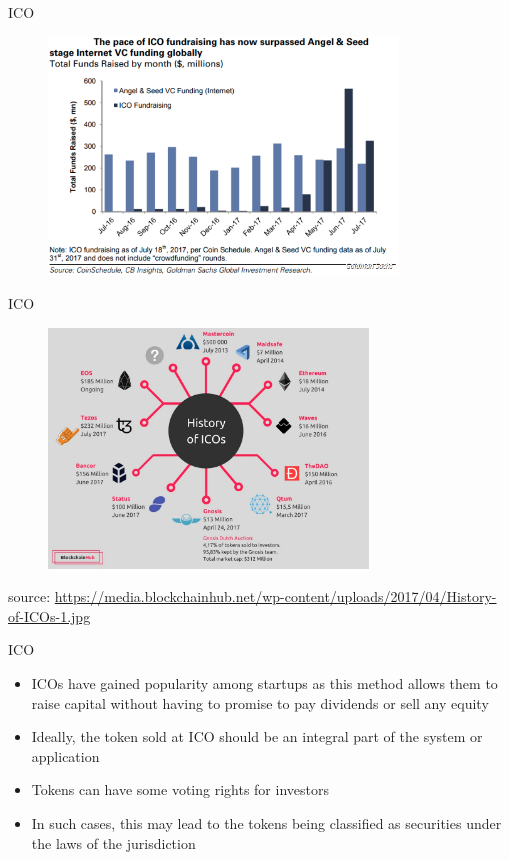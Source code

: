 \documentclass[10pt]{beamer}
\begin{document}
\begin{frame}{ICO}
	\begin{figure}[]
		\centering
		\includegraphics  [width=93mm]{Images/ico2}
	\end{figure}
\end{frame}


\begin{frame}{ICO}
	\begin{figure}[]
		\centering
		\includegraphics  [width=85mm]{Images/ico1}
	\end{figure}
	\begin{scriptsize}
		source: \href{https://blockchainhub.net/ico-initial-coin-offerings/}{https://media.blockchainhub.net/wp-content/uploads/2017/04/History-of-ICOs-1.jpg}
	\end{scriptsize}
\end{frame}


\begin{frame}{ICO}
	\begin{itemize}
		\item ICOs have gained popularity among startups as this method allows them to raise capital without having to promise to pay dividends or sell any equity
		\item Ideally, the token sold at ICO should be an integral part of the system or application
		\item Tokens can have some voting rights for investors
		\item In such cases, this may lead to the tokens being classified as securities under the laws of the jurisdiction
	\end{itemize}
\end{frame}
\end{document}
